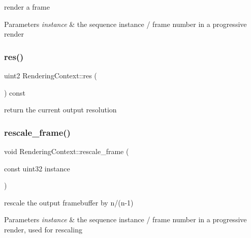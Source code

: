 render a frame


\begin{DoxyParams}{Parameters}
{\em instance} & the sequence instance / frame number in a progressive render \\
\hline
\end{DoxyParams}
\mbox{\label{struct_rendering_context_ad1a58510bdaf6f373080835abf5db2db}} 
\subsubsection{\texorpdfstring{res()}{res()}}
{\footnotesize\ttfamily uint2 Rendering\+Context\+::res (\begin{DoxyParamCaption}{ }\end{DoxyParamCaption}) const}

return the current output resolution \mbox{\label{struct_rendering_context_a6fb940a3b78a8a3faf82676c95ab1e6f}} 
\subsubsection{\texorpdfstring{rescale\+\_\+frame()}{rescale\_frame()}}
{\footnotesize\ttfamily void Rendering\+Context\+::rescale\+\_\+frame (\begin{DoxyParamCaption}\item[{const uint32}]{instance }\end{DoxyParamCaption})}

rescale the output framebuffer by n/(n-\/1)


\begin{DoxyParams}{Parameters}
{\em instance} & the sequence instance / frame number in a progressive render, used for rescaling \\
\hline
\end{DoxyParams}
\mbox{\label{struct_rendering_context_a90646054a967de36410bb114d55a35cf}} 

